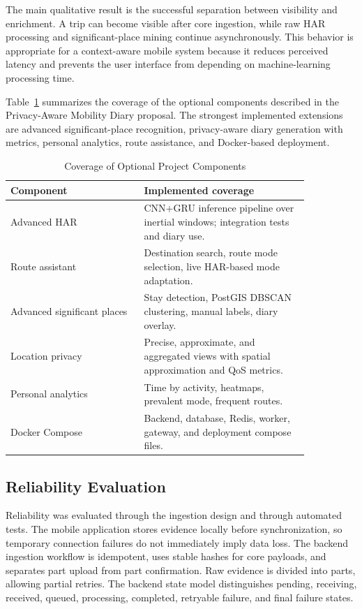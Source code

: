 \documentclass[conference,a4paper]{IEEEtran}
\begin{document}
The main qualitative result is the successful separation between visibility and enrichment. A trip can become visible after core ingestion, while raw HAR processing and significant-place mining continue asynchronously. This behavior is appropriate for a context-aware mobile system because it reduces perceived latency and prevents the user interface from depending on machine-learning processing time.

Table~\ref{tab:extensions} summarizes the coverage of the optional components described in the Privacy-Aware Mobility Diary proposal. The strongest implemented extensions are advanced significant-place recognition, privacy-aware diary generation with metrics, personal analytics, route assistance, and Docker-based deployment.

\begin{table}[htbp]
\caption{Coverage of Optional Project Components}
\begin{center}
\begin{tabular}{p{0.38\linewidth} p{0.47\linewidth}}
\toprule
\textbf{Component} & \textbf{Implemented coverage}\\
\midrule
Advanced HAR & CNN+GRU inference pipeline over inertial windows; integration tests and diary use.\\
Route assistant & Destination search, route mode selection, live HAR-based mode adaptation.\\
Advanced significant places & Stay detection, PostGIS DBSCAN clustering, manual labels, diary overlay.\\
Location privacy & Precise, approximate, and aggregated views with spatial approximation and QoS metrics.\\
Personal analytics & Time by activity, heatmaps, prevalent mode, frequent routes.\\
Docker Compose & Backend, database, Redis, worker, gateway, and deployment compose files.\\
\bottomrule
\end{tabular}
\label{tab:extensions}
\end{center}
\end{table}

\subsection{Reliability Evaluation}

Reliability was evaluated through the ingestion design and through automated tests. The mobile application stores evidence locally before synchronization, so temporary connection failures do not immediately imply data loss. The backend ingestion workflow is idempotent, uses stable hashes for core payloads, and separates part upload from part confirmation. Raw evidence is divided into parts, allowing partial retries. The backend state model distinguishes pending, receiving, received, queued, processing, completed, retryable failure, and final failure states.
\end{document}
